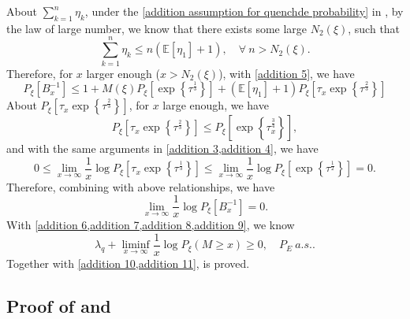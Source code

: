 \documentclass[]{article}
\numberwithin{equation}{section}
\theoremstyle{thmstyleone}%
\theoremstyle{thmstyletwo}%
\theoremstyle{thmstylethree}%
\theoremstyle{thmstylefour}%
\theoremstyle{thmstylefive}%
\theoremstyle{thmstylesix}%
\newcommand{\E}{\mathbb{E}}
\begin{document}
	About $\sum_{k=1}^{n} \eta_{k}$, under the \cref{addition assumption for quenchde probability} in , by the law of large number, we know that there exists some large $N_2(\xi)$, such that
	\[
	\sum_{k=1}^{n} \eta_{k} \leqslant n(\E\left[\eta_1\right]+1), \quad \forall ~n>N_2(\xi).
	\]
	Therefore, for $x$ larger enough ($x>N_2(\xi)$), with \cref{addition 5}, we have
	\begin{equation}
		P_\xi[B_x^{-1}] \leqslant
		1+ M(\xi)P_\xi\left[\exp\left\{\tau^{\frac{1}{3}}\right\}\right]
		+(\E\left[\eta_1\right]+1) P_\xi\left[
		\tau_x\exp\left\{\tau^{\frac{2}{3}}\right\}
		\right]
	\end{equation}
	About $P_\xi\left[
	\tau_x\exp\left\{\tau^{\frac{2}{3}}\right\}
	\right]$, for $x$ large enough, we have
	\begin{equation}
		P_\xi\left[\tau_x\exp\left\{\tau^{\frac{2}{3}}\right\} \right] \leqslant P_\xi\left[\exp\left\{\tau_x^{\frac{3}{4}}\right\}\right],
	\end{equation}
	and with the same arguments in \cref{addition 3,addition 4}, we have
	\begin{equation}
		0\leqslant\lim\limits_{x\rightarrow\infty} \frac{1}{x}\log P_\xi\left[\tau_x\exp\left\{\tau^{\frac{1}{3}} \right\}\right] \leqslant
		\lim\limits_{x\rightarrow\infty} \frac{1}{x}\log P_\xi\left[\exp\left\{\tau^{\frac{1}{2}} \right\}\right]=0.
	\end{equation}
	Therefore, combining with above relationships, we have
	\begin{equation}\label{addition 6}
		\lim\limits_{x\rightarrow\infty} \frac{1}{x}\log P_\xi[B_x^{-1}] = 0.
	\end{equation}
	With \cref{addition 6,addition 7,addition 8,addition 9}, we know
	\begin{equation}\label{addition 11}
		\lambda_q +\liminf\limits_{x\rightarrow\infty} \frac{1}{x} \log P_\xi\left(M\geqslant x\right) \geqslant 0, \quad P_E~a.s..
	\end{equation}
	Together with \cref{addition 10,addition 11},  is proved.
	
	
	\subsection{Proof of  and }\label{Section3.2}
	
\end{document}

